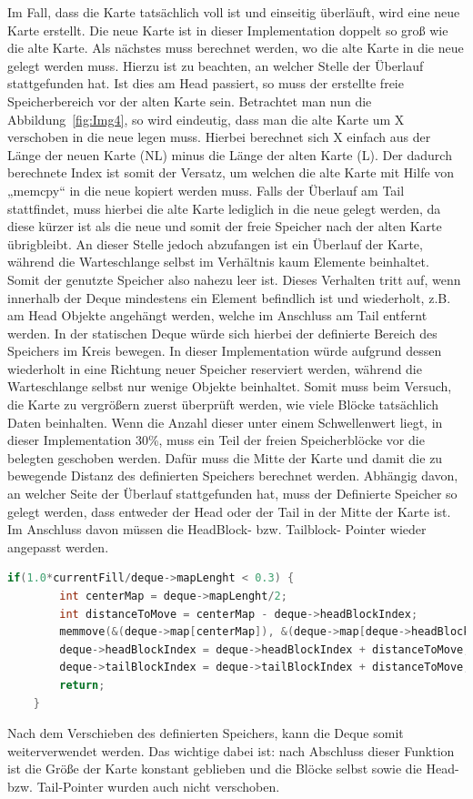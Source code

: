 \documentclass{TUBAFarbeiten}
\begin{document}
Im Fall, dass die Karte tatsächlich voll ist und einseitig überläuft, wird eine neue Karte erstellt. Die neue Karte ist in dieser Implementation doppelt so groß wie die alte Karte. Als nächstes muss berechnet werden, wo die alte Karte in die neue gelegt werden muss. Hierzu ist zu beachten, an welcher Stelle der Überlauf stattgefunden hat. Ist dies am Head passiert, so muss der erstellte freie Speicherbereich vor der alten Karte sein. Betrachtet man nun die Abbildung~\ref{fig:Img4}, so wird eindeutig, dass man die alte Karte um X verschoben in die neue legen muss. Hierbei berechnet sich X einfach aus der Länge der neuen Karte (NL) minus die Länge der alten Karte (L). Der dadurch berechnete Index ist somit der Versatz, um welchen die alte Karte mit Hilfe von „memcpy“ in die neue kopiert werden muss. 
Falls der Überlauf am Tail stattfindet, muss hierbei die alte Karte lediglich in die neue gelegt werden, da diese kürzer ist als die neue und somit der freie Speicher nach der alten Karte übrigbleibt. \newline
An dieser Stelle jedoch abzufangen ist ein Überlauf der Karte, während die Warteschlange selbst im Verhältnis kaum Elemente beinhaltet. Somit der genutzte Speicher also nahezu leer ist. Dieses Verhalten tritt auf, wenn innerhalb der Deque mindestens ein Element befindlich ist und wiederholt, z.B. am Head Objekte angehängt werden, welche im Anschluss am Tail entfernt werden. In der statischen Deque würde sich hierbei der definierte Bereich des Speichers im Kreis bewegen. In dieser Implementation würde aufgrund dessen wiederholt in eine Richtung neuer Speicher reserviert werden, während die Warteschlange selbst nur wenige Objekte beinhaltet.
Somit muss beim Versuch, die Karte zu vergrößern zuerst überprüft werden, wie viele Blöcke tatsächlich Daten beinhalten. Wenn die Anzahl dieser unter einem Schwellenwert liegt, in dieser Implementation 30\%, muss ein Teil der freien Speicherblöcke vor die belegten geschoben werden. Dafür muss die Mitte der Karte und damit die zu bewegende Distanz des definierten Speichers berechnet werden. Abhängig davon, an welcher Seite der Überlauf stattgefunden hat, muss der Definierte Speicher so gelegt werden, dass entweder der Head oder der Tail in der Mitte der Karte ist. Im Anschluss davon müssen die HeadBlock- bzw. Tailblock- Pointer wieder angepasst werden.  
\begin{lstlisting}[language=C, frame=single, style=customc]
    if(1.0*currentFill/deque->mapLenght < 0.3) {
        int centerMap = deque->mapLenght/2;
        int distanceToMove = centerMap - deque->headBlockIndex;
        memmove(&(deque->map[centerMap]), &(deque->map[deque->headBlockIndex]), (currentFill*sizeof(void*)) );
        deque->headBlockIndex = deque->headBlockIndex + distanceToMove;
        deque->tailBlockIndex = deque->tailBlockIndex + distanceToMove;
        return;
    }
\end{lstlisting}
Nach dem Verschieben des definierten Speichers, kann die Deque somit weiterverwendet werden. Das wichtige dabei ist: nach Abschluss dieser Funktion ist die Größe der Karte konstant geblieben und die Blöcke selbst sowie die Head- bzw. Tail-Pointer wurden auch nicht verschoben. 
\end{document}
